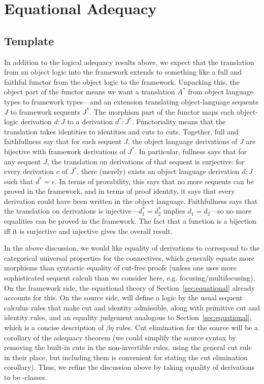 \section{Equational Adequacy}
\label{sec:adequacy-equational}

\subsection{Template}

In addition to the logical adequacy results above, we expect that the
translation from an object logic into the framework extends to something
like a full and faithful functor from the object logic to the framework.
Unpacking this, the object part of the functor means we want a
translation $A^*$ from object language types to framework types---and an
extension translating object-language sequents $J$ to framework sequents
$J^*$.  The morphism part of the functor maps each object-logic
derivation $d : J$ to a derivation $d^* : J^*$.  Functoriality means
that the translation takes identities to identities and cuts to cuts.
Together, full and faithfullness say that for each sequent $J$, the
object language derivations of $J$ are bijective with framework
derivations of $J^*$.  In particular, fullness says that for any sequent
$J$, the translation on derivations of that sequent is surjective: for
every derivation $e$ of $J^*$, there (merely) exists an object language
derivation $d : J$ such that $d^* = e$.  In terms of provability, this
says that no more sequents can be proved in the framework, and in terms
of proof identity, it says that every derivation could have been written
in the object language. Faithfullness says that the translation on
derivations is injective---$d_1^* = d_2^*$ implies $d_1 = d_2$---so no
more equalities can be proved in the framework.  The fact that a
function is a bijection iff it is surjective and injective gives the
overall result.

In the above discussion, we would like equality of derivations to
correspond to the categorical universal properties for the connectives,
which generally equate more morphisms than syntactic equality of
cut-free proofs (unless one uses more sophisticated sequent calculi than
we consider here, e.g. focusing/multifocusing).  On the framework side,
the equational theory of Section~\ref{sec:equational} already accounts
for this.  On the source side, will define a logic by the usual sequent
calculus rules that make cut and identity admissible, along with
primitive cut and identity rules, and an equality judgement analogous to
Section~\ref{sec:equational}, which is a concise description of
$\beta\eta$ rules.  Cut elimination for the source will be a corollary
of the adequacy theorem (we could simplify the source syntax by removing
the built-in cuts in the non-invertible rules, using the general cut
rule in their place, but including them is convenient for stating the
cut elimination corollary).  Thus, we refine the discussion above by
taking equality of derivations to be \deq-classes.

